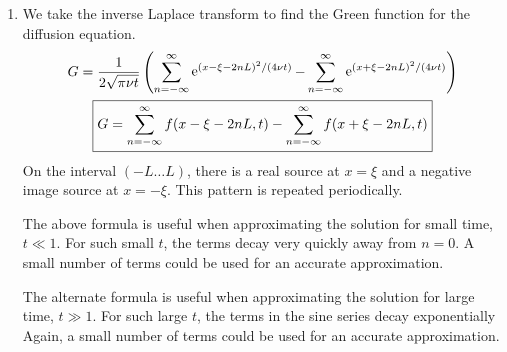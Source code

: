 {\begin{Solution}
\begin{enumerate}
  \item
    We take the inverse Laplace transform to find the Green function for the 
    diffusion equation.
    \begin{gather*}
      G = \frac{1}{2 \sqrt{\pi \nu t}} \left( 
        \sum_{n=-\infty}^\infty \mathop{\mathrm{e}}\nolimits^{ (x - \xi - 2 n L)^2 / (4 \nu t) }
        - \sum_{n=-\infty}^\infty \mathop{\mathrm{e}}\nolimits^{ (x + \xi - 2 n L)^2 / (4 \nu t) } \right)
      \\
      \boxed{
        G = \sum_{n=-\infty}^\infty f(x - \xi - 2 n L, t) - \sum_{n=-\infty}^\infty f(x + \xi - 2 n L,t)
        }
    \end{gather*}
    On the interval $(-L \ldots L)$, there is a real source at $x = \xi$ and a negative
    image source at $x = - \xi$.  This pattern is repeated periodically.
    
    The above formula is useful when approximating the solution for small time,
    $t \ll 1$.  For such small $t$, the terms decay very quickly away from 
    $n = 0$.  A small number of terms could be used for an accurate 
    approximation.
    
    The alternate formula is useful when approximating the
    solution for large time, $t \gg 1$.  For such large $t$, the terms in
    the sine series decay exponentially Again, a small number of terms
    could be used for an accurate approximation.
  \end{enumerate}
\end{Solution}










}
